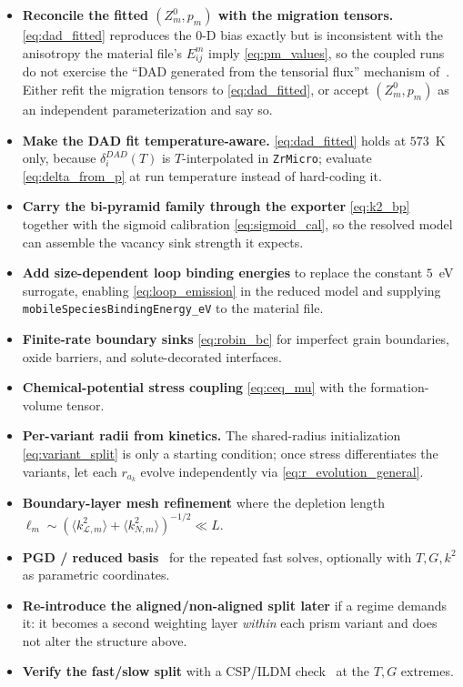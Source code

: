 \documentclass[11pt]{article}
\newcommand{\Lcal}{\mathcal{L}}
\newcommand{\ZrMicro}{\texttt{ZrMicro}}
\newcommand{\code}[1]{\texttt{#1}}
\begin{document}
\begin{itemize}[leftmargin=1.4em]
\item \textbf{Reconcile the fitted $(Z^0_m,p_m)$ with the migration tensors.}
\eqref{eq:dad_fitted} reproduces the 0-D bias exactly but is inconsistent with
the anisotropy the material file's $E^m_{ij}$ imply \eqref{eq:pm_values}, so the
coupled runs do not exercise the ``DAD generated from the tensorial flux''
mechanism of~\cite{PoGhoniem2026D1M1}. Either refit the migration tensors to
\eqref{eq:dad_fitted}, or accept $(Z^0_m,p_m)$ as an independent
parameterization and say so.
\item \textbf{Make the DAD fit temperature-aware.} \eqref{eq:dad_fitted} holds at
$573$~K only, because $\delta^{DAD}_i(T)$ is $T$-interpolated in \ZrMicro{};
evaluate \eqref{eq:delta_from_p} at run temperature instead of hard-coding it.
\item \textbf{Carry the bi-pyramid family through the exporter}
\eqref{eq:k2_bp} together with the sigmoid calibration
\eqref{eq:sigmoid_cal}, so the resolved model can assemble the vacancy sink
strength it expects.
\item \textbf{Add size-dependent loop binding energies} to replace the constant
$5$~eV surrogate, enabling \eqref{eq:loop_emission} in the reduced model and
supplying \code{mobileSpeciesBindingEnergy\_eV} to the material file.
\item \textbf{Finite-rate boundary sinks} \eqref{eq:robin_bc} for imperfect grain
boundaries, oxide barriers, and solute-decorated interfaces.
\item \textbf{Chemical-potential stress coupling} \eqref{eq:ceq_mu} with the
formation-volume tensor.
\item \textbf{Per-variant radii from kinetics.} The shared-radius initialization
\eqref{eq:variant_split} is only a starting condition; once stress differentiates
the variants, let each $r_{a_k}$ evolve independently via
\eqref{eq:r_evolution_general}.
\item \textbf{Boundary-layer mesh refinement} where the depletion length
$\ell_m\sim(\langle k^2_{\Lcal,m}\rangle+\langle k^2_{N,m}\rangle)^{-1/2}\ll L$.
\item \textbf{PGD / reduced basis}~\cite{Chinesta2011} for the repeated fast
solves, optionally with $T,G,k^2$ as parametric coordinates.
\item \textbf{Re-introduce the aligned/non-aligned split later} if a regime
demands it: it becomes a second weighting layer \emph{within} each prism variant
and does not alter the structure above.
\item \textbf{Verify the fast/slow split} with a CSP/ILDM
check~\cite{LamGoussis1994,MaasPope1992} at the $T,G$ extremes.
\end{itemize}
\end{document}
